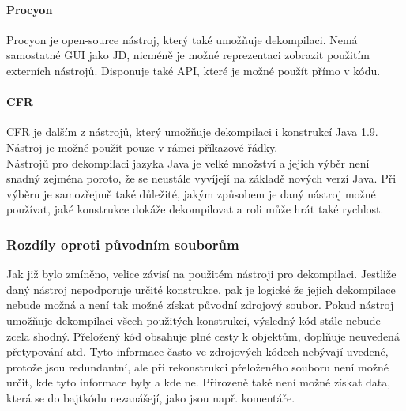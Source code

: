 				\paragraph{Procyon}
					Procyon \cite{procyon} je open-source nástroj, který také umožňuje dekompilaci. Nemá samostatné GUI jako JD, nicméně je možné reprezentaci zobrazit použitím externích nástrojů. Disponuje také API, které je možné použít přímo v kódu.
					
				\paragraph{CFR}
					CFR \cite{cfr} je dalším z nástrojů, který umožňuje dekompilaci i konstrukcí Java 1.9. Nástroj je možné použít pouze v rámci příkazové řádky.\\
					
				Nástrojů pro dekompilaci jazyka Java je velké množství a jejich výběr není snadný zejména poroto, že se neustále vyvíjejí na základě nových verzí Java. Při výběru je samozřejmě také důležité, jakým způsobem je daný nástroj možné používat, jaké konstrukce dokáže dekompilovat a roli může hrát také rychlost.
				
			\subsubsection{Rozdíly oproti původním souborům}
				Jak již bylo zmíněno, velice závisí na použitém nástroji pro dekompilaci. Jestliže daný nástroj nepodporuje určité konstrukce, pak je logické že jejich dekompilace nebude možná a není tak možné získat původní zdrojový soubor. Pokud nástroj umožňuje dekompilaci všech použitých konstrukcí, výsledný kód stále nebude zcela shodný. Přeložený kód obsahuje plné cesty k objektům, doplňuje neuvedená přetypování atd. Tyto informace často ve zdrojových kódech nebývají uvedené, protože jsou redundantní, ale při rekonstrukci přeloženého souboru není možné určit, kde tyto informace byly a kde ne. Přirozeně také není možné získat data, která se do bajtkódu nezanášejí, jako jsou např. komentáře.